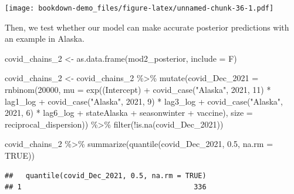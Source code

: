 \documentclass[
]{book}
\newenvironment{Shaded}{\begin{snugshade}}{\end{snugshade}}
\newcommand{\AttributeTok}[1]{\textcolor[rgb]{0.77,0.63,0.00}{#1}}
\newcommand{\ConstantTok}[1]{\textcolor[rgb]{0.00,0.00,0.00}{#1}}
\newcommand{\DecValTok}[1]{\textcolor[rgb]{0.00,0.00,0.81}{#1}}
\newcommand{\FloatTok}[1]{\textcolor[rgb]{0.00,0.00,0.81}{#1}}
\newcommand{\FunctionTok}[1]{\textcolor[rgb]{0.00,0.00,0.00}{#1}}
\newcommand{\NormalTok}[1]{#1}
\newcommand{\OtherTok}[1]{\textcolor[rgb]{0.56,0.35,0.01}{#1}}
\newcommand{\SpecialCharTok}[1]{\textcolor[rgb]{0.00,0.00,0.00}{#1}}
\newcommand{\StringTok}[1]{\textcolor[rgb]{0.31,0.60,0.02}{#1}}
\begin{document}
\texttt{[image: bookdown-demo\_files/figure-latex/unnamed-chunk-36-1.pdf]}

Then, we test whether our model can make accurate posterior predictions with an example in Alaska.

\begin{Shaded}
\begin{Highlighting}[]
\NormalTok{covid\_chains\_2 }\OtherTok{\textless{}{-}} \FunctionTok{as.data.frame}\NormalTok{(mod2\_posterior, }\AttributeTok{include =}\NormalTok{ F)}

\NormalTok{covid\_chains\_2 }\OtherTok{\textless{}{-}}\NormalTok{ covid\_chains\_2 }\SpecialCharTok{\%\textgreater{}\%}
  \FunctionTok{mutate}\NormalTok{(}\AttributeTok{covid\_Dec\_2021 =} \FunctionTok{rnbinom}\NormalTok{(}\DecValTok{20000}\NormalTok{, }\AttributeTok{mu =} \FunctionTok{exp}\NormalTok{(}\StringTok{\textasciigrave{}}\AttributeTok{(Intercept)}\StringTok{\textasciigrave{}} \SpecialCharTok{+} \FunctionTok{covid\_case}\NormalTok{(}\StringTok{"Alaska"}\NormalTok{, }\DecValTok{2021}\NormalTok{, }\DecValTok{11}\NormalTok{) }\SpecialCharTok{*}\NormalTok{ lag1\_log }\SpecialCharTok{+} \FunctionTok{covid\_case}\NormalTok{(}\StringTok{"Alaska"}\NormalTok{, }\DecValTok{2021}\NormalTok{, }\DecValTok{9}\NormalTok{) }\SpecialCharTok{*}\NormalTok{ lag3\_log }\SpecialCharTok{+} \FunctionTok{covid\_case}\NormalTok{(}\StringTok{"Alaska"}\NormalTok{, }\DecValTok{2021}\NormalTok{, }\DecValTok{6}\NormalTok{) }\SpecialCharTok{*}\NormalTok{ lag6\_log }\SpecialCharTok{+}\NormalTok{ stateAlaska }\SpecialCharTok{+}\NormalTok{ seasonwinter }\SpecialCharTok{+}\NormalTok{ vaccine), }\AttributeTok{size =}\NormalTok{ reciprocal\_dispersion)) }\SpecialCharTok{\%\textgreater{}\%}
  \FunctionTok{filter}\NormalTok{(}\SpecialCharTok{!}\FunctionTok{is.na}\NormalTok{(covid\_Dec\_2021)) }

\NormalTok{covid\_chains\_2 }\SpecialCharTok{\%\textgreater{}\%}
  \FunctionTok{summarize}\NormalTok{(}\FunctionTok{quantile}\NormalTok{(covid\_Dec\_2021, }\FloatTok{0.5}\NormalTok{, }\AttributeTok{na.rm =} \ConstantTok{TRUE}\NormalTok{))}
\end{Highlighting}
\end{Shaded}

\begin{verbatim}
##   quantile(covid_Dec_2021, 0.5, na.rm = TRUE)
## 1                                         336
\end{verbatim}
\end{document}
